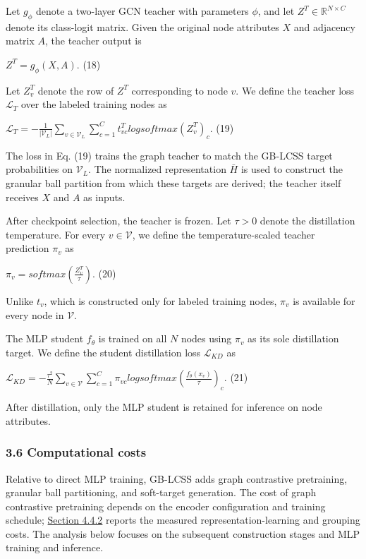Let \(g_{\phi}\) denote a two-layer GCN teacher with parameters \(\phi\), and let \(Z^{T} \in \mathbb{R}^{N \times C}\) denote its class-logit matrix. Given the original node attributes \(X\) and adjacency matrix \(A\), the teacher output is

\(Z^{T} = g_{\phi}(X,A).\) (18)

Let \(Z_{v}^{T}\) denote the row of \(Z^{T}\) corresponding to node \(v\). We define the teacher loss \(\mathcal{L}_{T}\) over the labeled training nodes as

\(\mathcal{L}_{T} = - \frac{1}{|\mathcal{V}_{L}|}\sum_{v \in \mathcal{V}_{L}}^{}{\sum_{c = 1}^{C}t_{vc}^{T}}logsoftmax\left( Z_{v}^{T} \right)_{c}.\) (19)

The loss in Eq. (19) trains the graph teacher to match the GB-LCSS target probabilities on \(\mathcal{V}_{L}\). The normalized representation \(\bar{H}\) is used to construct the granular ball partition from which these targets are derived; the teacher itself receives \(X\) and \(A\) as inputs.

After checkpoint selection, the teacher is frozen. Let \(\tau > 0\) denote the distillation temperature. For every \(v \in \mathcal{V}\), we define the temperature-scaled teacher prediction \(\pi_{v}\) as

\(\pi_{v} = softmax\left( \frac{Z_{v}^{T}}{\tau} \right).\) (20)

Unlike \(t_{v}\), which is constructed only for labeled training nodes, \(\pi_{v}\) is available for every node in \(\mathcal{V}\).

The MLP student \(f_{\theta}\) is trained on all \(N\) nodes using \(\pi_{v}\) as its sole distillation target. We define the student distillation loss \(\mathcal{L}_{KD}\) as

\(\mathcal{L}_{KD} = - \frac{\tau^{2}}{N}\sum_{v\mathcal{\in V}}^{}{\sum_{c = 1}^{C}\pi_{vc}}logsoftmax\left( \frac{f_{\theta}(x_{v})}{\tau} \right)_{c}.\) (21)

After distillation, only the MLP student is retained for inference on node attributes.

\subsubsection{3.6 Computational costs}\label{computational-costs}

Relative to direct MLP training, GB-LCSS adds graph contrastive pretraining, granular ball partitioning, and soft-target generation. The cost of graph contrastive pretraining depends on the encoder configuration and training schedule; \hyperref[computational-cost]{Section 4.4.2} reports the measured representation-learning and grouping costs. The analysis below focuses on the subsequent construction stages and MLP training and inference.

